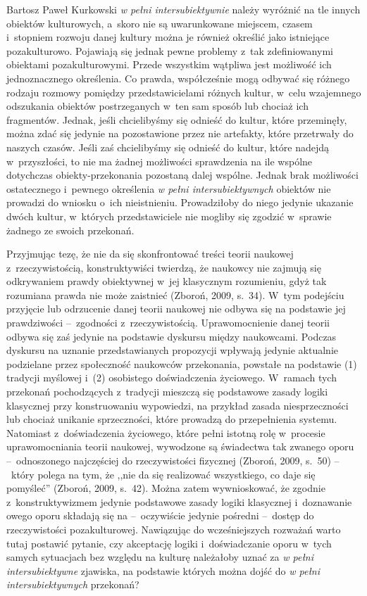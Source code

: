 \begin{artplenv}{Bartosz Paweł Kurkowski}
\textit{w pełni intersubiektywnie} należy wyróżnić na tle innych obiektów kulturowych, a~skoro nie są uwarunkowane
miejscem, czasem i~stopniem rozwoju danej kultury można je również określić jako istniejące pozakulturowo. Pojawiają
się jednak pewne problemy z~tak zdefiniowanymi obiektami pozakulturowymi. Przede wszystkim wątpliwa jest możliwość ich
jednoznacznego określenia. Co prawda, współcześnie mogą odbywać się różnego rodzaju rozmowy pomiędzy przedstawicielami
różnych kultur, w~celu wzajemnego odszukania obiektów postrzeganych w~ten sam sposób lub chociaż ich fragmentów.
Jednak, jeśli chcielibyśmy się odnieść do kultur, które przeminęły, można zdać się jedynie na pozostawione przez nie
artefakty, które przetrwały do naszych czasów. Jeśli zaś chcielibyśmy się odnieść do kultur, które
nadejdą w~przyszłości, to nie ma żadnej możliwości sprawdzenia na ile wspólne dotychczas obiekty-przekonania pozostaną dalej
wspólne. Jednak brak możliwości ostatecznego i~pewnego określenia \textit{w pełni intersubiektywnych} obiektów nie
prowadzi do wniosku o~ich nieistnieniu. Prowadziłoby do niego jedynie ukazanie dwóch kultur, w~których przedstawiciele
nie mogliby się zgodzić w~sprawie żadnego ze swoich przekonań.


Przyjmując tezę, że nie da się skonfrontować treści teorii naukowej z~rzeczywistością, konstruktywiści twierdzą, że
naukowcy nie zajmują się odkrywaniem prawdy obiektywnej w~jej klasycznym rozumieniu, gdyż tak rozumiana prawda nie może
zaistnieć \label{ref:RNDO1PHIaYoe5}(Zboroń, 2009, s.~34). W~tym podejściu przyjęcie lub odrzucenie danej teorii
naukowej nie odbywa się na podstawie jej prawdziwości --~zgodności z~rzeczywistością. Uprawomocnienie danej teorii
odbywa się zaś jedynie na podstawie dyskursu między naukowcami. Podczas dyskursu na uznanie przedstawianych propozycji
wpływają jedynie aktualnie podzielane przez społeczność naukowców przekonania, powstałe na podstawie (1) tradycji
myślowej i~(2) osobistego doświadczenia życiowego. W~ramach tych przekonań pochodzących z~tradycji mieszczą się
podstawowe zasady logiki klasycznej przy konstruowaniu wypowiedzi, na przykład zasada niesprzeczności lub chociaż
unikanie sprzeczności, które prowadzą do przepełnienia systemu. Natomiast z~doświadczenia życiowego, które pełni
istotną rolę w~procesie uprawomocniania teorii naukowej, wywodzone są świadectwa tak zwanego oporu --~odnoszonego
najczęściej do rzeczywistości fizycznej \label{ref:RNDQ2XUwaEB1h}(Zboroń, 2009, s.~50) --~który polega na tym, że ,,nie
da się realizować wszystkiego, co daje się pomyśleć'' \label{ref:RNDFGGrXVPfBH}(Zboroń, 2009, s.~42). Można zatem
wywnioskować, że zgodnie z~konstruktywizmem jedynie podstawowe zasady logiki klasycznej i~doznawanie owego oporu
składają się na --~oczywiście jedynie pośredni --~dostęp do rzeczywistości pozakulturowej. Nawiązując do wcześniejszych
rozważań warto tutaj postawić pytanie, czy akceptację logiki i~doświadczanie oporu w~tych samych sytuacjach bez względu
na kulturę należałoby uznać za \textit{w pełni intersubiektywne} zjawiska, na podstawie których  można dojść do
\textit{w pełni intersubiektywnych} przekonań?



\end{artplenv}
